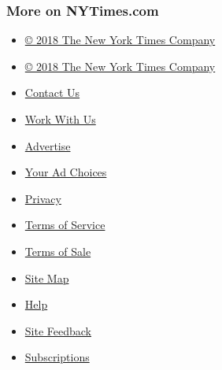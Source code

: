 \hypertarget{more-on-nytimescom}{%
\subsubsection{More on NYTimes.com}\label{more-on-nytimescom}}

\begin{itemize}
\tightlist
\item
  \href{http://www.nytco.com}{© 2018 The New York Times Company}
\end{itemize}

\begin{itemize}
\tightlist
\item
  \href{http://www.nytco.com}{© 2018 The New York Times Company}
\item
  \href{http://www.nytimes3xbfgragh.onion/ref/membercenter/help/infoservdirectory.html}{Contact
  Us}
\item
  \href{http://www.nytco.com/careers}{Work With Us}
\item
  \href{http://www.nytimes.whsites.net/mediakit}{Advertise}
\item
  \href{http://www.nytimes3xbfgragh.onion/content/help/rights/privacy/policy/privacy-policy.html\#pp}{Your
  Ad Choices}
\item
  \href{http://www.nytimes3xbfgragh.onion/privacy}{Privacy}
\item
  \href{http://www.nytimes3xbfgragh.onion/ref/membercenter/help/agree.html}{Terms
  of Service}
\item
  \href{http://www.nytimes3xbfgragh.onion/content/help/rights/sale/terms-of-sale.html}{Terms
  of Sale}
\end{itemize}

\begin{itemize}
\tightlist
\item
  \href{http://spiderbites.nytimes3xbfgragh.onion}{Site Map}
\item
  \href{http://www.nytimes3xbfgragh.onion/membercenter/sitehelp.html}{Help}
\item
  \href{https://myaccount.nytimes3xbfgragh.onion/membercenter/feedback.html}{Site
  Feedback}
\item
  \href{http://www.nytimes3xbfgragh.onion/subscriptions/Multiproduct/lp5558.html?campaignId=37WXW}{Subscriptions}
\end{itemize}

